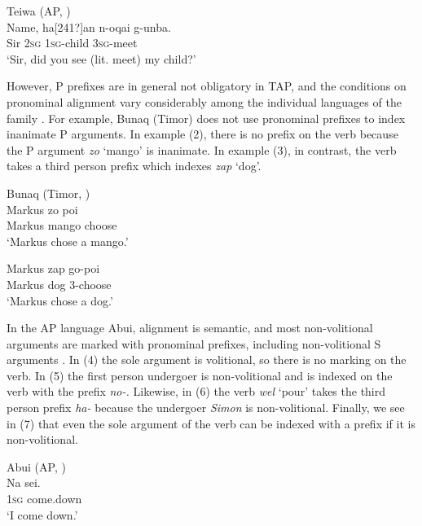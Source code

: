 \ea%
Teiwa (AP, \citet[159]{Klamer2010})\\
\gll  Name, ha[241?]an n-oqai g-unba{\textglotstop}. \\
  Sir \textsc{2sg} \textsc{1sg}-child \textsc{3sg}-meet  \\
\glt `Sir, did you see (lit. meet) my child?'
\z




However, P prefixes are in general not obligatory in TAP, and the conditions on pronominal alignment vary considerably among the individual languages of the family \citep[chapter 10]{FeddenEtAl2013}. For example, Bunaq (Timor) does not use pronominal prefixes to index inanimate P arguments. In example (2), there is no prefix on the verb because the P argument \textit{zo }`mango' is inanimate. In example (3), in contrast, the verb takes a third person prefix which indexes \textit{zap} `dog'.

\ea%
Bunaq (Timor, \citet[122]{Schapper2009})\\
\gll  Markus zo poi \\
   Markus mango  choose \\
\glt `Markus chose a mango.'
\z





\ea%
\gll  Markus zap go-poi \\
    Markus dog \textsc{3}-choose\\
\glt `Markus chose a dog.'
\z




In the AP language Abui, alignment is semantic, and most non-volitional arguments are marked with pronominal prefixes, including non-volitional S arguments \citep[chapter 10]{FeddenEtAl2013}. In (4) the sole argument is volitional, so there is no marking on the verb. In (5) the first person undergoer is non-volitional and is indexed on the verb with the prefix \textit{no-.} Likewise, in (6) the verb \textit{wel }`pour' takes the third person prefix \textit{ha-} because the undergoer \textit{Simon} is non-volitional. Finally, we see in (7) that even the sole argument of the verb can be indexed with a prefix if it is non-volitional.

\ea%
Abui (AP, \citet[80.171]{Kratochvil2007})\\
\gll  Na sei. \\
  \textsc{1sg} come.down \\
\glt `I come down.'
\z





